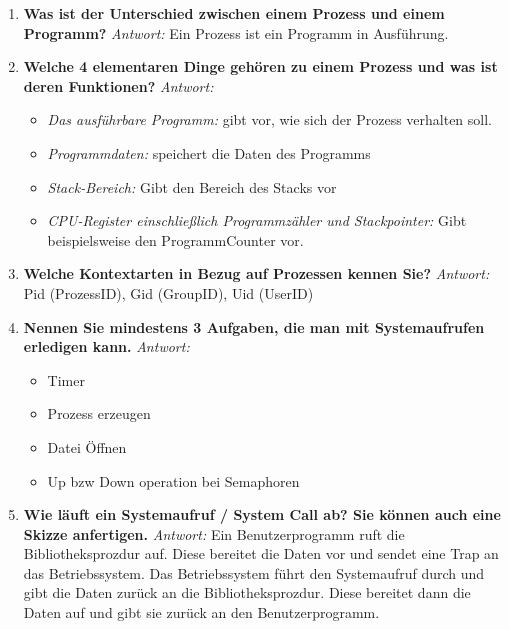 \begin{enumerate}[label=\arabic*.]
    \item \textbf{Was ist der Unterschied zwischen einem Prozess und einem Programm?} \newline
          \textit{Antwort:} Ein Prozess ist ein Programm in Ausführung.

    \item \textbf{Welche 4 elementaren Dinge gehören zu einem Prozess und was ist deren Funktionen?} \newline
          \textit{Antwort:} \begin{itemize}
              \item \textit{Das ausführbare Programm:} gibt vor, wie sich der Prozess verhalten soll.
              \item \textit{Programmdaten:} speichert die Daten des Programms
              \item \textit{Stack-Bereich:} Gibt den Bereich des Stacks vor
              \item \textit{CPU-Register einschließlich Programmzähler und Stackpointer:} Gibt beispielsweise
                    den ProgrammCounter vor.
          \end{itemize}

    \item \textbf{Welche Kontextarten in Bezug auf Prozessen kennen Sie?} \newline
          \textit{Antwort:} Pid (ProzessID), Gid (GroupID), Uid (UserID)

    \item \textbf{Nennen Sie mindestens 3 Aufgaben, die man mit Systemaufrufen erledigen kann.} \newline
          \textit{Antwort:} \begin{itemize}
              \item Timer
              \item Prozess erzeugen
              \item Datei Öffnen
              \item Up bzw Down operation bei Semaphoren
          \end{itemize}

    \item \textbf{Wie läuft ein Systemaufruf / System Call ab? Sie können auch eine Skizze anfertigen.} \newline
          \textit{Antwort:} Ein Benutzerprogramm ruft die Bibliotheksprozdur auf. Diese bereitet die Daten vor und
          sendet eine Trap an das Betriebssystem. Das Betriebssystem führt den Systemaufruf durch und gibt die Daten
          zurück an die Bibliotheksprozdur. Diese bereitet dann die Daten auf und gibt sie zurück an den Benutzerprogramm.


\end{enumerate}
